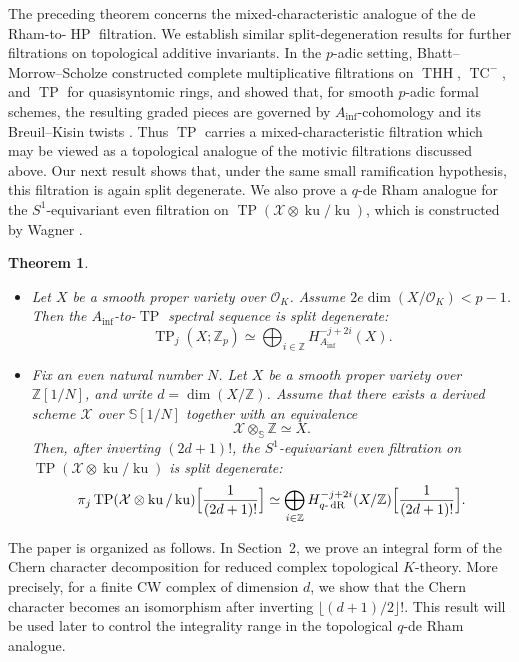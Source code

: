 \documentclass[11pt]{amsart}
\newtheorem{theorem}[lemma]{Theorem}
\numberwithin{equation}{section}
\newcommand{\Z}{\mathbb{Z}}
\newcommand{\sO}{\mathcal{O}}
\newcommand{\qdR}{q\text{-}\operatorname{{dR}}}
\numberwithin{equation}{section}
\newcommand{\Ainf}{A_{\operatorname{inf}}}
\newcommand{\THH}{\operatorname{THH}}
\newcommand{\TP}{\operatorname{TP}}
\newcommand{\TC}{\operatorname{TC}}
\newcommand{\HP}{\operatorname{HP}}
\newcommand{\ku}{\operatorname{ku}}
\newcommand{\bS}{\mathbb{S}}
\begin{document}
The preceding theorem concerns the mixed-characteristic analogue of the de Rham-to-$\HP$ filtration. We establish similar split-degeneration results for further filtrations on topological additive invariants. In the $p$-adic setting, Bhatt--Morrow--Scholze constructed complete multiplicative filtrations on $\THH$, $\TC^-$, and $\TP$ for quasisyntomic rings, and showed that, for smooth $p$-adic formal schemes, the resulting graded pieces are governed by $\Ainf$-cohomology and its Breuil--Kisin twists \cite[Theorem 1.12]{BMS19}. Thus $\TP$ carries a mixed-characteristic filtration which may be viewed as a topological analogue of the motivic filtrations discussed above. Our next result shows that, under the same small ramification hypothesis, this filtration is again split degenerate. We also prove a $q$-de Rham analogue for the $S^1$-equivariant even filtration on $\TP(\mathcal X\otimes \ku/\ku)$, which is constructed by Wagner \cite{W25arxiv}.

\begin{theorem}
\begin{itemize}
  \item[(1)] Let $X$ be a smooth proper variety over $\sO_K$. Assume $2e\dim(X/\sO_K)<p-1$. Then the $\Ainf$-to-$\TP$ spectral sequence is split degenerate:
  \[
    \TP_j(X;\Z_p)\simeq \bigoplus_{i\in \Z} H_{\Ainf}^{-j+2i}(X).
  \]

  \item[(2)] Fix an even natural number $N$. Let $X$ be a smooth proper variety over $\Z[1/N]$, and write $d=\dim(X/\Z)$. Assume that there exists a derived scheme $\mathcal X$ over $\bS[1/N]$ together with an equivalence
  \[
    \mathcal X\otimes_{\bS}\Z \simeq X.
  \]
  Then, after inverting $(2d+1)!$, the $S^1$-equivariant even filtration on $\TP(\mathcal X\otimes \ku/\ku)$ is split degenerate:
  \[
    \pi_j\TP(\mathcal X\otimes \ku/\ku)\Bigl[\frac{1}{(2d+1)!}\Bigr]
    \simeq
    \bigoplus_{i\in \Z} H_{\qdR}^{-j+2i}(X/\Z)\Bigl[\frac{1}{(2d+1)!}\Bigr].
  \]
\end{itemize}
\end{theorem}
The paper is organized as follows. In Section~2, we prove an integral form of the Chern character decomposition for reduced complex topological $K$-theory.  More precisely, for a finite CW complex of dimension $d$, we show that the Chern character becomes an isomorphism after inverting $\lfloor (d+1)/2\rfloor!$.  This result will be used later to control the integrality range in the topological $q$-de Rham analogue.
\end{document}
